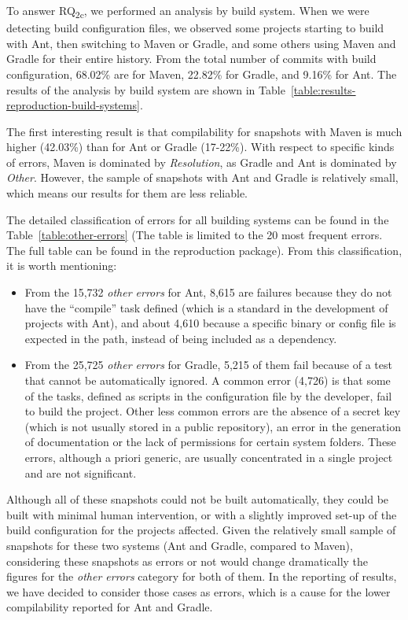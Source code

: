 To answer RQ\textsubscript{2c}, we performed an analysis by build system. When we were detecting build configuration files, we observed some projects starting to build with Ant, then switching to Maven or Gradle, and some others using Maven and Gradle for their entire history. From the total number of commits with build configuration, 68.02\% are for Maven, 22.82\% for Gradle, and 9.16\% for Ant. The results of the analysis by build system are shown in Table~\ref{table:results-reproduction-build-systems}.

The first interesting result is that compilability for snapshots with Maven is much higher (42.03\%) than for Ant or Gradle (17-22\%). With respect to specific kinds of errors, Maven is dominated by \textit{Resolution}, as Gradle and Ant is dominated by \textit{Other}. However, the sample of snapshots with Ant and Gradle is relatively small, which means our results for them are less reliable.

The detailed classification of errors for all building systems can be found in the Table~\ref{table:other-errors} (The table is limited to the 20 most frequent errors. The full table can be found in the reproduction package). 
From this classification, it is worth mentioning:
\begin{itemize}
 \item From the 15,732 \textit{other errors} for Ant, 8,615 are failures because they do not have the ``compile'' task defined (which is a standard in the development of projects with Ant), and about 4,610 because a specific binary or config file is expected in the path, instead of being included as a dependency.
 \item From the 25,725 \textit{other errors} for Gradle, 5,215 of them fail because of a test that cannot be automatically ignored. A common error (4,726) is that some of the tasks, defined as scripts in the configuration file by the developer, fail to build the project. Other less common errors are the absence of a secret key (which is not usually stored in a public repository), an error in the generation of documentation or the lack of permissions for certain system folders. These errors, although a priori generic, are usually concentrated in a single project and are not significant.
\end{itemize} 

Although all of these snapshots could not be built automatically, they could be built with minimal human intervention, or with a slightly improved set-up of the build configuration for the projects affected. Given the relatively small sample of snapshots for these two systems (Ant and Gradle, compared to Maven), considering these snapshots as errors or not would change dramatically the figures for the \textit{other errors} category for both of them. In the reporting of results, we have decided to consider those cases as errors, which is a cause for the lower compilability reported for Ant and Gradle.

